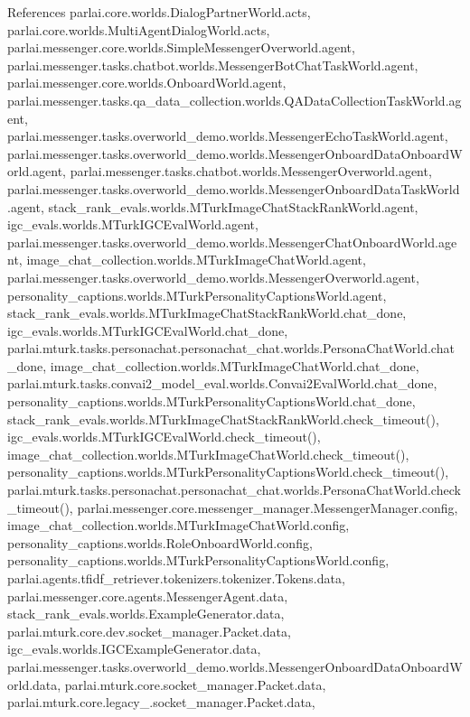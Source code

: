 References parlai.\+core.\+worlds.\+Dialog\+Partner\+World.\+acts, parlai.\+core.\+worlds.\+Multi\+Agent\+Dialog\+World.\+acts, parlai.\+messenger.\+core.\+worlds.\+Simple\+Messenger\+Overworld.\+agent, parlai.\+messenger.\+tasks.\+chatbot.\+worlds.\+Messenger\+Bot\+Chat\+Task\+World.\+agent, parlai.\+messenger.\+core.\+worlds.\+Onboard\+World.\+agent, parlai.\+messenger.\+tasks.\+qa\+\_\+data\+\_\+collection.\+worlds.\+Q\+A\+Data\+Collection\+Task\+World.\+agent, parlai.\+messenger.\+tasks.\+overworld\+\_\+demo.\+worlds.\+Messenger\+Echo\+Task\+World.\+agent, parlai.\+messenger.\+tasks.\+overworld\+\_\+demo.\+worlds.\+Messenger\+Onboard\+Data\+Onboard\+World.\+agent, parlai.\+messenger.\+tasks.\+chatbot.\+worlds.\+Messenger\+Overworld.\+agent, parlai.\+messenger.\+tasks.\+overworld\+\_\+demo.\+worlds.\+Messenger\+Onboard\+Data\+Task\+World.\+agent, stack\+\_\+rank\+\_\+evals.\+worlds.\+M\+Turk\+Image\+Chat\+Stack\+Rank\+World.\+agent, igc\+\_\+evals.\+worlds.\+M\+Turk\+I\+G\+C\+Eval\+World.\+agent, parlai.\+messenger.\+tasks.\+overworld\+\_\+demo.\+worlds.\+Messenger\+Chat\+Onboard\+World.\+agent, image\+\_\+chat\+\_\+collection.\+worlds.\+M\+Turk\+Image\+Chat\+World.\+agent, parlai.\+messenger.\+tasks.\+overworld\+\_\+demo.\+worlds.\+Messenger\+Overworld.\+agent, personality\+\_\+captions.\+worlds.\+M\+Turk\+Personality\+Captions\+World.\+agent, stack\+\_\+rank\+\_\+evals.\+worlds.\+M\+Turk\+Image\+Chat\+Stack\+Rank\+World.\+chat\+\_\+done, igc\+\_\+evals.\+worlds.\+M\+Turk\+I\+G\+C\+Eval\+World.\+chat\+\_\+done, parlai.\+mturk.\+tasks.\+personachat.\+personachat\+\_\+chat.\+worlds.\+Persona\+Chat\+World.\+chat\+\_\+done, image\+\_\+chat\+\_\+collection.\+worlds.\+M\+Turk\+Image\+Chat\+World.\+chat\+\_\+done, parlai.\+mturk.\+tasks.\+convai2\+\_\+model\+\_\+eval.\+worlds.\+Convai2\+Eval\+World.\+chat\+\_\+done, personality\+\_\+captions.\+worlds.\+M\+Turk\+Personality\+Captions\+World.\+chat\+\_\+done, stack\+\_\+rank\+\_\+evals.\+worlds.\+M\+Turk\+Image\+Chat\+Stack\+Rank\+World.\+check\+\_\+timeout(), igc\+\_\+evals.\+worlds.\+M\+Turk\+I\+G\+C\+Eval\+World.\+check\+\_\+timeout(), image\+\_\+chat\+\_\+collection.\+worlds.\+M\+Turk\+Image\+Chat\+World.\+check\+\_\+timeout(), personality\+\_\+captions.\+worlds.\+M\+Turk\+Personality\+Captions\+World.\+check\+\_\+timeout(), parlai.\+mturk.\+tasks.\+personachat.\+personachat\+\_\+chat.\+worlds.\+Persona\+Chat\+World.\+check\+\_\+timeout(), parlai.\+messenger.\+core.\+messenger\+\_\+manager.\+Messenger\+Manager.\+config, image\+\_\+chat\+\_\+collection.\+worlds.\+M\+Turk\+Image\+Chat\+World.\+config, personality\+\_\+captions.\+worlds.\+Role\+Onboard\+World.\+config, personality\+\_\+captions.\+worlds.\+M\+Turk\+Personality\+Captions\+World.\+config, parlai.\+agents.\+tfidf\+\_\+retriever.\+tokenizers.\+tokenizer.\+Tokens.\+data, parlai.\+messenger.\+core.\+agents.\+Messenger\+Agent.\+data, stack\+\_\+rank\+\_\+evals.\+worlds.\+Example\+Generator.\+data, parlai.\+mturk.\+core.\+dev.\+socket\+\_\+manager.\+Packet.\+data, igc\+\_\+evals.\+worlds.\+I\+G\+C\+Example\+Generator.\+data, parlai.\+messenger.\+tasks.\+overworld\+\_\+demo.\+worlds.\+Messenger\+Onboard\+Data\+Onboard\+World.\+data, parlai.\+mturk.\+core.\+socket\+\_\+manager.\+Packet.\+data, parlai.\+mturk.\+core.\+legacy\+\_.\+socket\+\_\+manager.\+Packet.\+data, 
